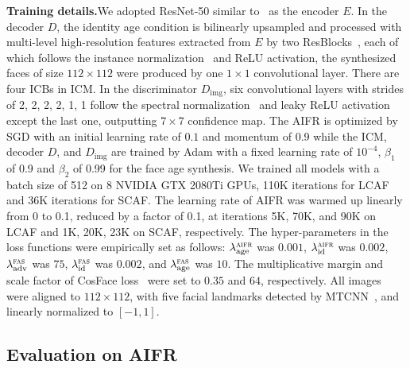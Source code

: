 \noindent\textbf{Training details.}\quad We adopted ResNet-50 similar to~\cite{deng2019arcface} as the encoder $E$. In the decoder $D$, the identity age condition is bilinearly upsampled and processed with multi-level high-resolution features extracted from $E$ by two ResBlocks~\cite{he2016deep}, each of which follows the instance normalization~\cite{ulyanov2016instance} and ReLU activation, the synthesized faces of size $112 \times 112$ were produced by one $1\times 1$ convolutional layer. There are four ICBs in ICM. In the discriminator $D_\mathrm{img}$, six convolutional layers with strides of 2, 2, 2, 2, 1, 1 follow the spectral normalization~\cite{miyato2018spectral} and leaky ReLU activation except the last one, outputting $7\times 7$ confidence map. The AIFR is optimized by SGD with an initial learning rate of $0.1$ and momentum of 0.9 while the ICM, decoder $D$, and $D_\mathrm{img}$ are trained by Adam with a fixed learning rate of $10^{-4}$, $\beta_1$ of 0.9 and $\beta_2$ of 0.99 for the face age synthesis. We trained all models with a batch size of 512 on 8 NVIDIA GTX 2080Ti GPUs, 110K iterations for LCAF and 36K iterations for SCAF. The learning rate of AIFR was warmed up linearly from 0 to 0.1, reduced by a factor of 0.1, at iterations 5K, 70K, and 90K on LCAF and 1K, 20K, 23K on SCAF, respectively. The hyper-parameters in the loss functions were empirically set as follows: $\lambda^{\textsc{aifr}}_{\mathrm{age}}$ was $0.001$, $\lambda^{\textsc{aifr}}_{\mathrm{id}}$ was $0.002$, $\lambda_{\mathrm{adv}}^{\textsc{fas}}$ was $75$, $\lambda_{\mathrm{id}}^{\textsc{fas}}$ was $0.002$, and $\lambda_{\mathrm{age}}^{\textsc{fas}}$ was $10$. The multiplicative margin and scale factor of CosFace loss~\cite{wang2018cosface} were set to $0.35$ and $64$, respectively. All images were aligned to $112\times 112$, with five facial landmarks detected by MTCNN~\cite{zhang2016joint}, and linearly normalized to $[-1, 1]$.

\subsection{Evaluation on AIFR}

